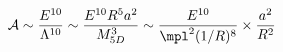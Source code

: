 \begin{equation}
{\cal A} \sim \frac{E^{10}}{\Lambda^{10}} \sim \frac{E^{10} R^5 a^2}{M_{5D}^3}
\sim \frac{E^{10}}{\mpl^2 (1/R)^8} \times \frac{a^2}{R^2} \label{AofR}
\end{equation}

